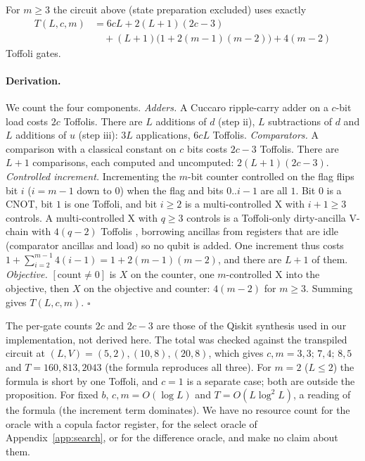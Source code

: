 \begin{proposition}\label{prop:toffoli}
For $m\ge3$ the circuit above (state preparation excluded) uses exactly
\[
\begin{aligned}T(L,c,m)&=6cL+2(L+1)(2c-3)\\&\quad+(L+1)\big(1+2(m-1)(m-2)\big)+4(m-2)\end{aligned}
\]
Toffoli gates.
\end{proposition}
\paragraph{Derivation.} We count the four components.
\emph{Adders.} A Cuccaro ripple-carry adder \citep{Cuccaro2004} on a $c$-bit load costs $2c$ Toffolis. There are $L$ additions of $d$ (step ii), $L$ subtractions of $d$ and $L$ additions of $u$ (step iii): $3L$ applications, $6cL$ Toffolis.
\emph{Comparators.} A comparison with a classical constant on $c$ bits costs $2c-3$ Toffolis. There are $L+1$ comparisons, each computed and uncomputed: $2(L+1)(2c-3)$.
\emph{Controlled increment.} Incrementing the $m$-bit counter controlled on the flag flips bit $i$ ($i=m-1$ down to $0$) when the flag and bits $0..i-1$ are all $1$. Bit $0$ is a CNOT, bit $1$ is one Toffoli, and bit $i\ge2$ is a multi-controlled X with $i+1\ge3$ controls. A multi-controlled X with $q\ge3$ controls is a Toffoli-only dirty-ancilla V-chain with $4(q-2)$ Toffolis \citep[Lemma 7.2]{Barenco1995}, borrowing ancillas from registers that are idle (comparator ancillas and load) so no qubit is added. One increment thus costs $1+\sum_{i=2}^{m-1}4(i-1)=1+2(m-1)(m-2)$, and there are $L+1$ of them.
\emph{Objective.} $[\text{count}\neq 0]$ is $X$ on the counter, one $m$-controlled X into the objective, then $X$ on the objective and counter: $4(m-2)$ for $m\ge3$.
Summing gives $T(L,c,m)$. \hfill$\square$

The per-gate counts $2c$ and $2c-3$ are those of the Qiskit synthesis used in our implementation, not derived here. The total was checked against the transpiled circuit at $(L,V)=(5,2),(10,8),(20,8)$, which gives $c,m=3,3;\,7,4;\,8,5$ and $T=160,813,2043$ (the formula reproduces all three). For $m=2$ ($L\le2$) the formula is short by one Toffoli, and $c=1$ is a separate case; both are outside the proposition. For fixed $b$, $c,m=O(\log L)$ and $T=O(L\log^2L)$, a reading of the formula (the increment term dominates). We have no resource count for the oracle with a copula factor register, for the select oracle of Appendix~\ref{app:search}, or for the difference oracle, and make no claim about them.

